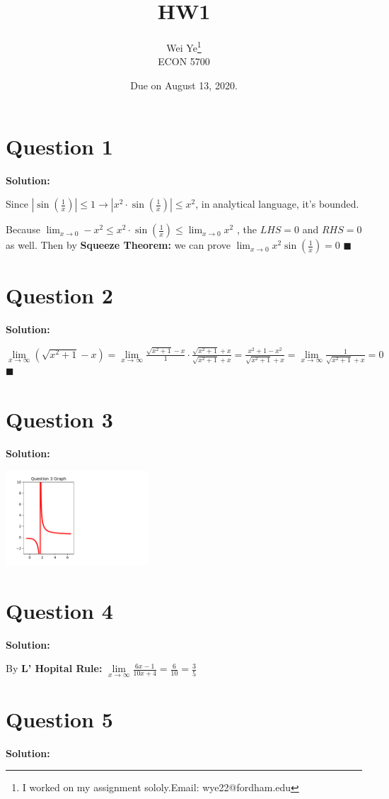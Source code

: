 \documentclass[11pt]{article} %
\title{HW1}
\author{Wei Ye\footnote{I worked on my assignment sololy.Email: wye22@fordham.edu}  	\\
												ECON 5700}
\date{Due on August 13, 2020.}
\begin{document}
	\maketitle
	\section{Question 1}
	\textbf{Solution:}
	
	Since $|\sin(\frac{1}{x})|\leq1 \rightarrow |x^2\cdot\sin(\frac{1}{x})|\leq x^2$, in analytical language, it's bounded. 
	
	Because $\lim_{x\rightarrow0}-x^2 \leq x^2\cdot \sin(\frac{1}{x})\leq \lim_{x\rightarrow0}x^2$ , the $LHS =0$ and $RHS=0$ as well. Then by \textbf{Squeeze Theorem:} we can prove $\lim_{x\rightarrow0}x^2\sin(\frac{1}{x})=0$ $\blacksquare$

\section{Question 2}
\textbf{Solution:}

	$\lim\limits_{x\to\infty}\left(\sqrt{x^2+1}-x\right)=\lim\limits_{x\to\infty}\frac{\sqrt{x^2+1}-x}{1}\cdot\frac{\sqrt{x^2+1}+x}{\sqrt{x^2+1}+x}=\frac{x^2+1-x^2}{\sqrt{x^2+1}+x}=\lim\limits_{x\to\infty}\frac{1}{\sqrt{x^2+1}+x}=0$ $\blacksquare$
	
	
\section{Question 3}
\textbf{Solution:}

\includegraphics[width=0.4\textwidth, angle=0]{question3.pdf}



\section{Question 4}
\textbf{Solution:}

By \textbf{L' Hopital Rule:} $\lim\limits_{x\to\infty}\frac{6x-1}{10x+4}=\frac{6}{10}=\frac{3}{5}$

\section{Question 5}
\textbf{Solution:}
\end{document}
